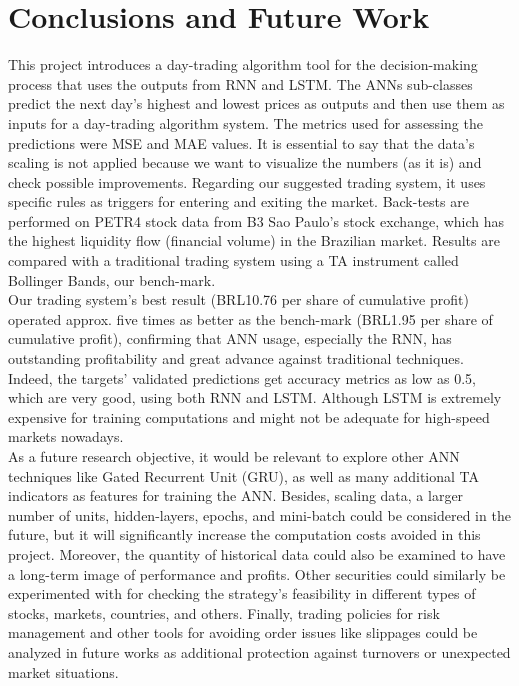 \section{Conclusions and Future Work}
\label{chap:Conclusions and Future Work}

\quad This project introduces a day-trading algorithm tool for the decision-making process that uses the outputs from RNN and LSTM. The ANNs sub-classes predict the next day's highest and lowest prices as outputs and then use them as inputs for a day-trading algorithm system. The metrics used for assessing the predictions were MSE and MAE values. It is essential to say that the data's scaling is not applied because we want to visualize the numbers (as it is) and check possible improvements. Regarding our suggested trading system, it uses specific rules as triggers for entering and exiting the market. Back-tests are performed on PETR4 stock data from B3 Sao Paulo's stock exchange, which has the highest liquidity flow (financial volume) in the Brazilian market. Results are compared with a traditional trading system using a TA instrument called Bollinger Bands, our bench-mark.\\

Our trading system's best result (BRL10.76 per share of cumulative profit) operated approx. five times as better as the bench-mark (BRL1.95 per share of cumulative profit), confirming that ANN usage, especially the RNN, has outstanding profitability and great advance against traditional techniques. Indeed, the targets' validated predictions get accuracy metrics as low as 0.5, which are very good, using both RNN and LSTM. Although LSTM is extremely expensive for training computations and might not be adequate for high-speed markets nowadays.\\

As a future research objective, it would be relevant to explore other ANN techniques like Gated Recurrent Unit (GRU), as well as many additional TA indicators as features for training the ANN. Besides, scaling data, a larger number of units, hidden-layers, epochs, and mini-batch could be considered in the future, but it will significantly increase the computation costs avoided in this project. Moreover, the quantity of historical data could also be examined to have a long-term image of performance and profits. Other securities could similarly be experimented with for checking the strategy's feasibility in different types of stocks, markets, countries, and others. Finally, trading policies for risk management and other tools for avoiding order issues like slippages could be analyzed in future works as additional protection against turnovers or unexpected market situations.
